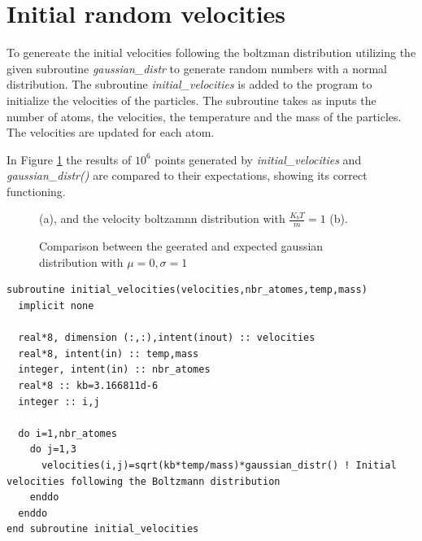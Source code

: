 \documentclass{cis320}
\begin{document}
\section{Initial random velocities}
To genereate the initial velocities following the boltzman distribution utilizing the given subroutine \textit{gaussian\_distr} to generate random numbers with a normal distribution. The subroutine \textit{initial\_velocities} is added to the program to initialize the velocities of the particles. The subroutine takes as inputs the number of atoms, the velocities, the temperature and the mass of the particles. The velocities are updated for each atom.\\
\par
In Figure \ref{fig:dist} the results of $10^{6}$ points generated by \textit{initial\_velocities} and \textit{gaussian\_distr()} are compared to their expectations, showing its correct functioning.\\

\begin{figure}[h]
    \centering
    \caption{Comparison between the geerated and expected gaussian distribution with $\mu=0,\sigma=1$}(a), and the velocity boltzamnn distribution with $\frac{K_bT}{m}=1$ (b).
    \label{fig:dist}
\end{figure}

\begin{lstlisting}[caption=Velocity initalization]
subroutine initial_velocities(velocities,nbr_atomes,temp,mass)
  implicit none

  real*8, dimension (:,:),intent(inout) :: velocities 
  real*8, intent(in) :: temp,mass
  integer, intent(in) :: nbr_atomes
  real*8 :: kb=3.166811d-6
  integer :: i,j

  do i=1,nbr_atomes
    do j=1,3
      velocities(i,j)=sqrt(kb*temp/mass)*gaussian_distr() ! Initial velocities following the Boltzmann distribution
    enddo
  enddo
end subroutine initial_velocities \end{lstlisting}
\end{document}
